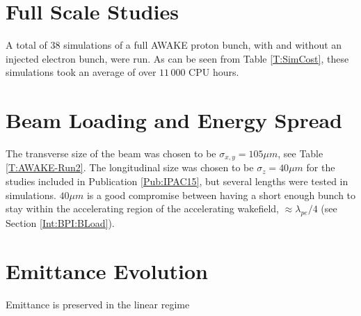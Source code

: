 \section{Full Scale Studies}
\label{Sim:Plasma}

A total of $38$ simulations of a full AWAKE proton bunch, with and without an injected electron bunch, were run.
As can be seen from Table \ref{T:SimCost}, these simulations took an average of over $11\,000$ CPU hours.


\section{Beam Loading and Energy Spread}
\label{Sim:BLoad}

The transverse size of the beam was chosen to be $\sigma_{x,y}=105\unit{\mu m}$, see Table \ref{T:AWAKE-Run2}.
The longitudinal size was chosen to be $\sigma_{z}=40\unit{\mu m}$ for the studies included in Publication \ref{Pub:IPAC15}, but several lengths were tested in simulations.
$40\unit{\mu m}$ is a good compromise between having a short enough bunch to stay within the accelerating region of the accelerating wakefield, $\approx \lambda_{pe}/4$ (see Section \ref{Int:BPI:BLoad}).

\section{Emittance Evolution}
\label{Sim:Emitt}

Emittance is preserved in the linear regime

